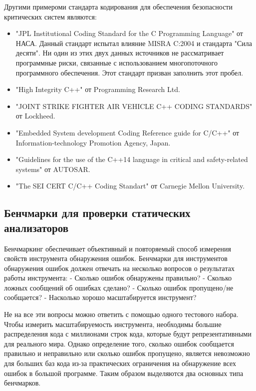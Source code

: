 Другими примероми стандарта кодирования для обеспечения безопасности критических систем являются:
\begin{itemize}
    \item "JPL Institutional Coding Standard for the C Programming Language"\autocite{JPL} от НАСА. Данный стандарт испытал влияние MISRA C:2004 и 
        стандарта "Сила десяти"\autocite{powerOfTen}. Ни один из этих двух данных источников не рассматривает программные риски, связанные с использованием 
        многопоточного программного обеспечения. Этот стандарт призван заполнить этот пробел.
    \item "High Integrity C++"\autocite{highIntegrity} от Programming Research Ltd. 
    \item "JOINT STRIKE FIGHTER AIR VEHICLE C++ CODING STANDARDS"\autocite{JSF} от Lockheed.
    \item "Embedded System development Coding Reference guide for C/C++"\autocite{escrC, escrCPP} от Information-technology Promotion Agency, Japan.
    \item "Guidelines for the use of the C++14 language in critical and safety-related systems"\autocite{autosar} от AUTOSAR.
    \item "The SEI CERT C/C++ Coding Standart" от Carnegie Mellon University\autocite{CERT}. 
\end{itemize}

\subsection{Бенчмарки для проверки статических анализаторов}
Бенчмаркинг обеспечивает объективный и повторяемый способ измерения свойств инструмента обнаружения ошибок. Бенчмарки для инструментов обнаружения 
ошибок должен отвечать на несколько вопросов о результатах работы инструмента\autocite{}: 
- Сколько ошибок обнаружены правильно?
- Сколько ложных сообщений об ошибках сделано?
- Сколько ошибок пропущено/не сообщается?
- Насколько хорошо масштабируется инструмент?

Не на все эти вопросы можно ответить с помощью одного тестового набора. Чтобы измерить масштабируемость инструмента, необходимы большие распределения 
кода с миллионами строк кода, которые будут репрезентативными для реального мира. Однако определение того, сколько ошибок сообщается правильно и 
неправильно или сколько ошибок пропущено, является невозможно для больших баз кода из-за практических ограничения на обнаружение всех ошибок в большой 
программе. Таким образом выделяются два основных типа бенчмарков. 

